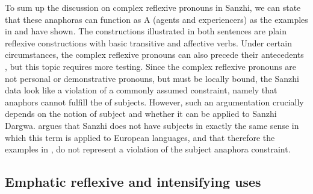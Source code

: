To sum up the discussion on complex reflexive pronouns in Sanzhi, we can state that these anaphoras can function as A (agents and experiencers) as the examples in  and  have shown. The constructions illustrated in both sentences are plain reflexive constructions with basic transitive and affective verbs. Under certain circumstances, the complex reflexive pronouns can also precede their antecedents , but this topic requires more testing. Since the complex reflexive pronouns are not personal or demonstrative pronouns, but must be locally bound, the Sanzhi data look like a violation of a commonly assumed constraint, namely that anaphors cannot fulfill the  of subjects. However, such an argumentation crucially depends on the notion of subject and whether it can be applied to Sanzhi Dargwa. \citet{Forker2014} argues that Sanzhi does not have subjects in exactly the same sense in which this term is applied to European languages, and that therefore the examples in ,  do not represent a violation of the subject anaphora constraint.



\subsection{Emphatic reflexive and intensifying uses}
\label{ssec:Emphatic reflexive use}


